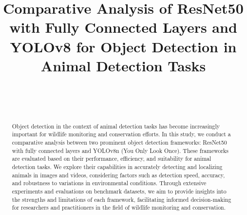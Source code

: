 \documentclass[conference]{IEEEtran}
\begin{document}
\title{\fontsize{20}{24}\selectfont Comparative Analysis of ResNet50 with Fully Connected Layers and YOLOv8 for Object Detection in Animal Detection Tasks}

\author{
\and
{}
\and
{}
 \\
\and
{}
\\
\and
{}
}
\maketitle
\begin{abstract}
Object detection in the context of animal detection tasks has become increasingly important for wildlife monitoring and conservation efforts. In this study, we conduct a comparative analysis between two prominent object detection frameworks: ResNet50 with fully connected layers and YOLOv8n (You Only Look Once). These frameworks are evaluated based on their performance, efficiency, and suitability for animal detection tasks. We explore their capabilities in accurately detecting and localizing animals in images and videos, considering factors such as detection speed, accuracy, and robustness to variations in environmental conditions. Through extensive experiments and evaluations on benchmark datasets, we aim to provide insights into the strengths and limitations of each framework, facilitating informed decision-making for researchers and practitioners in the field of wildlife monitoring and conservation.
\end{abstract}
\end{document}
